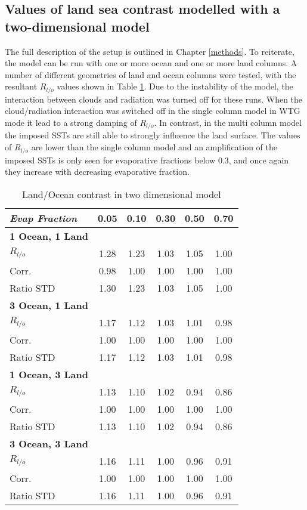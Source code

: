 \subsection{Values of land sea contrast modelled with a two-dimensional model}

The full description of the setup is outlined in Chapter \ref{methods}. To 
reiterate, the model can be run with one or more ocean and one or more land 
columns. A number of different geometries of land and ocean columns were tested, 
with the resultant $R_{l/o}$ values shown in Table \ref{tab:tdm_Rlo}. Due to the 
instability of the model, the interaction between clouds and radiation was 
turned off for these runs. When the cloud/radiation interaction was switched off 
in the single column model in WTG mode it lead to a strong damping of $R_{l/o}$.  
In contrast, in the multi column model the imposed SSTs are still able to 
strongly influence the land surface. The values of $R_{l/o}$  are lower than the 
single column model and an amplification of the imposed SSTs is only seen for 
evaporative fractions below 0.3, and once again they increase with decreasing 
evaporative fraction.   

\begin{center}
	\begin{table}[ht]
		\caption{Land/Ocean contrast in two dimensional model}
		\label{tab:tdm_Rlo}
		\scriptsize
	\begin{tabular}{ l  c  c  c  c  c }
		\hline
		\textit{Evap Fraction}	& 0.05  & 0.10 & 0.30  & 0.50  & 0.70 \\ \hline
		\textbf{1 Ocean, 1 Land}\\
		$R_{l/o}$ 					& 1.28  & 1.23 & 1.03  & 1.05 & 1.00\\ 
		Corr.					& 0.98  & 1.00 & 1.00  & 1.00 & 1.00\\ %
		Ratio STD          		& 1.30  & 1.23 & 1.03  & 1.05 & 1.00\\ \hline
		\textbf{3 Ocean, 1 Land}\\
		$R_{l/o}$ 					& 1.17  & 1.12 & 1.03  & 1.01 & 0.98\\ %
		Corr.					& 1.00  & 1.00 & 1.00  & 1.00 & 1.00\\ %
		Ratio STD          		& 1.17  & 1.12 & 1.03  & 1.01 & 0.98\\ \hline
		\textbf{1 Ocean, 3 Land}\\
		$R_{l/o}$ 					& 1.13  & 1.10 & 1.02  & 0.94 & 0.86\\ %
		Corr.					& 1.00  & 1.00 & 1.00  & 1.00 & 1.00\\ %
		Ratio STD          		& 1.13  & 1.10 & 1.02  & 0.94 & 0.86\\ \hline
		\textbf{3 Ocean, 3 Land}\\
		$R_{l/o}$ 					& 1.16  & 1.11 & 1.00  & 0.96 & 0.91\\ %
		Corr.					& 1.00  & 1.00 & 1.00  & 1.00 & 1.00\\ %
		Ratio STD          		& 1.16  & 1.11 & 1.00  & 0.96 & 0.91\\ \hline
	\end{tabular}
	\end{table}
\end{center}

